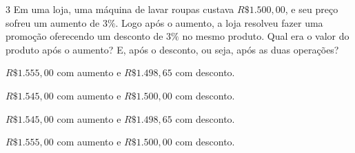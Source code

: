

\num{3}  Em uma loja, uma máquina de lavar roupas custava $R\$ 1.500,00$, e seu
preço sofreu um aumento de $3\%$. Logo após o aumento, a loja resolveu
fazer uma promoção oferecendo um desconto de $3\%$ no mesmo produto. Qual
era o valor do produto após o aumento? E, após o desconto, ou seja, após as
duas operações?

\begin{escolha}
\item $R\$ 1.555,00$ com aumento e $R\$ 1.498,65$ com desconto.
\item $R\$ 1.545,00$ com aumento e $R\$ 1.500,00$ com desconto.
\item $R\$ 1.545,00$ com aumento e $R\$ 1.498,65$ com desconto.
\item $R\$ 1.555,00$ com aumento e $R\$ 1.500,00$ com desconto.
\end{escolha}


